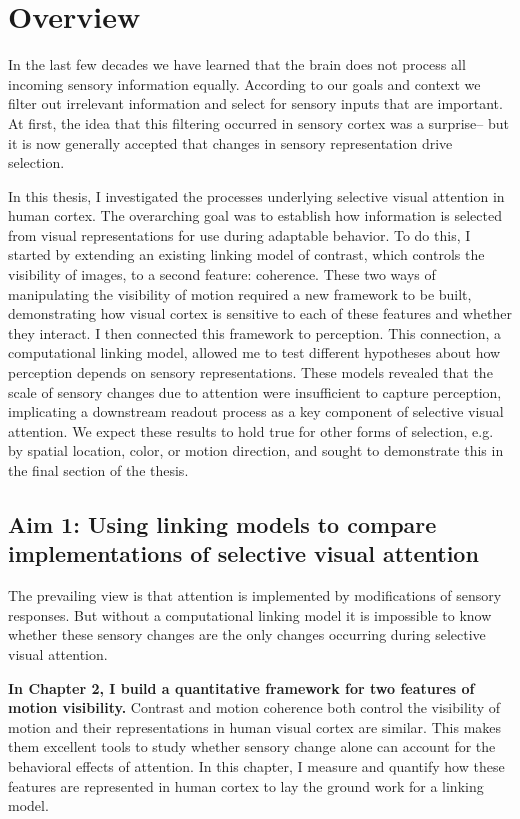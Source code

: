 \section{Overview}

In the last few decades we have learned that the brain does not process all incoming sensory information equally. According to our goals and context we filter out irrelevant information and select for sensory inputs that are important. At first, the idea that this filtering occurred in sensory cortex was a surprise-- but it is now generally accepted that changes in sensory representation drive selection.

In this thesis, I investigated the processes underlying selective visual attention in human cortex. The overarching goal was to establish how information is selected from visual representations for use during adaptable behavior. To do this, I started by extending an existing linking model of contrast, which controls the visibility of images, to a second feature: coherence. These two ways of manipulating the visibility of motion required a new framework to be built, demonstrating how visual cortex is sensitive to each of these features and whether they interact. I then connected this framework to perception. This connection, a computational linking model, allowed me to test different hypotheses about how perception depends on sensory representations. These models revealed that the scale of sensory changes due to attention were insufficient to capture perception, implicating a downstream readout process as a key component of selective visual attention. We expect these results to hold true for other forms of selection, e.g. by spatial location, color, or motion direction, and sought to demonstrate this in the final section of the thesis.

\subsection{Aim 1: Using linking models to compare implementations of selective visual attention}

The prevailing view is that attention is implemented by modifications of sensory responses. But without a computational linking model it is impossible to know whether these sensory changes are the only changes occurring during selective visual attention. 

\textbf{In Chapter 2, I build a quantitative framework for two features of motion visibility.} Contrast and motion coherence both control the visibility of motion and their representations in human visual cortex are similar. This makes them excellent tools to study whether sensory change alone can account for the behavioral effects of attention. In this chapter, I measure and quantify how these features are represented in human cortex to lay the ground work for a linking model.

